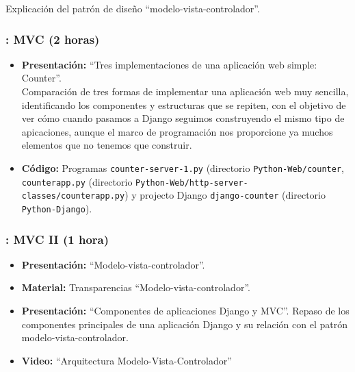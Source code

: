 \documentclass[a4paper,12pt]{article}
\begin{document}
Explicación del patrón de diseño ``modelo-vista-controlador''.

\subsubsection{\juevesH: MVC (2 horas)}
\label{cal:juevesH}

\begin{itemize}
\item \textbf{Presentación:} ``Tres implementaciones de una aplicación web simple: Counter''. \\
  Comparación de tres formas de implementar una aplicación web muy sencilla, identificando los componentes y estructuras que se repiten, con el objetivo de ver cómo cuando pasamos a Django seguimos construyendo el mismo tipo de apicaciones, aunque el marco de programación nos proporcione ya muchos elementos que no tenemos que construir.
\item \textbf{Código:} Programas \verb|counter-server-1.py| (directorio \verb|Python-Web/counter|, \verb|counterapp.py| (directorio \verb|Python-Web/http-server-classes/counterapp.py|) y projecto Django \verb|django-counter| (directorio \verb|Python-Django|).
%

\end{itemize}

\subsubsection{\juevesI: MVC II (1 hora)}
\label{cal:juevesI}


\begin{itemize}
\item \textbf{Presentación:} ``Modelo-vista-controlador''.
\item \textbf{Material:} Transparencias ``Modelo-vista-controlador''.
\item \textbf{Presentación:} ``Componentes de aplicaciones Django y MVC''.
  Repaso de los componentes principales de una aplicación Django y su relación con el patrón modelo-vista-controlador.
\item \textbf{Video:} ``Arquitectura Modelo-Vista-Controlador''
\end{itemize}
\end{document}

